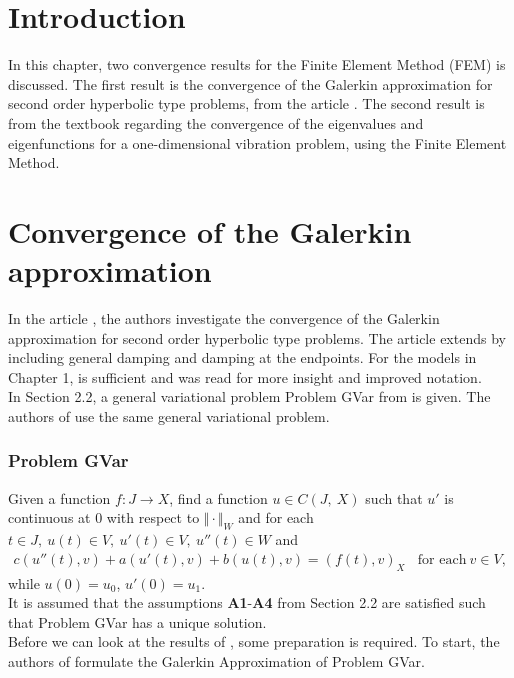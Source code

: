 \documentclass[../../main.tex]{subfiles}
\begin{document}
\section{Introduction}
In this chapter, two convergence results for the Finite Element Method (FEM) is discussed. The first result is the convergence of the Galerkin approximation for second order hyperbolic type problems, from the article \cite{BV13}. The second result is from the textbook \cite{SF97} regarding the convergence of the eigenvalues and eigenfunctions for a one-dimensional vibration problem, using the Finite Element Method.

\section{Convergence of the Galerkin approximation}
In the article \cite{BV13}, the authors investigate the convergence of the Galerkin approximation for second order hyperbolic type problems. The article \cite{BV18} extends \cite{BV13} by including general damping and damping at the endpoints. For the models in Chapter 1, \cite{BV13} is sufficient and \cite{BV18} was read for more insight and improved notation.\\

In Section 2.2, a general variational problem Problem GVar from \cite{VV02} is given. The authors of \cite{BV13} use the same general variational problem.

\subsubsection*{Problem GVar}
Given a function $f:J\rightarrow X$, find a function $u\in C(J,\ X)$ such that $u'$ is continuous at $0$ with respect to $\Vert \cdot \Vert_{W}$ and for each $t\in J,\ u(t)\in V,\ u'(t) \in V,\ u''(t)\in W$ and
\begin{eqnarray}
	c(u''(t),v)+a(u'(t),v)+b(u(t),v)= (f(t),v)_{X} \ \ \ \ \textrm{for each} \ v \in V, \label{GV_PB1}
\end{eqnarray}
while $u(0)=u_{0}$, $u'(0)=u_{1}$.\\

It is assumed that the assumptions \textbf{A1}-\textbf{A4} from Section 2.2 are satisfied such that Problem GVar has a unique solution.\\

Before we can look at the results of \cite{BV13}, some preparation is required. To start, the authors of \cite{BV13} formulate the Galerkin Approximation of Problem GVar.
\end{document}

